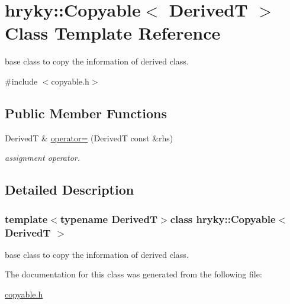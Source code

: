 \hypertarget{classhryky_1_1_copyable}{\section{hryky\-:\-:Copyable$<$ Derived\-T $>$ Class Template Reference}
\label{classhryky_1_1_copyable}
}


base class to copy the information of derived class.  




{\ttfamily \#include $<$copyable.\-h$>$}

\subsection*{Public Member Functions}
\begin{DoxyCompactItemize}
\item 
\hypertarget{classhryky_1_1_copyable_a8ba34166fbf522863d3318e820d18212}{Derived\-T \& \hyperlink{classhryky_1_1_copyable_a8ba34166fbf522863d3318e820d18212}{operator=} (Derived\-T const \&rhs)}\label{classhryky_1_1_copyable_a8ba34166fbf522863d3318e820d18212}

\begin{DoxyCompactList}\small\item\em assignment operator. \end{DoxyCompactList}\end{DoxyCompactItemize}


\subsection{Detailed Description}
\subsubsection*{template$<$typename Derived\-T$>$class hryky\-::\-Copyable$<$ Derived\-T $>$}

base class to copy the information of derived class. 

The documentation for this class was generated from the following file\-:\begin{DoxyCompactItemize}
\item 
\hyperlink{copyable_8h}{copyable.\-h}\end{DoxyCompactItemize}
